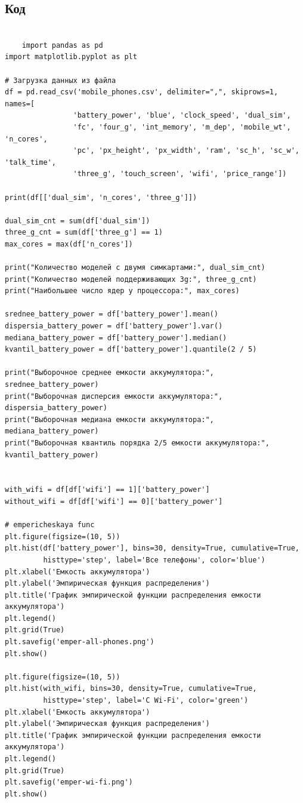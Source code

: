 \documentclass{article}
\begin{document}
\subsection{Код}\label{subsec:3}
\begin{verbatim}

    import pandas as pd
import matplotlib.pyplot as plt

# Загрузка данных из файла
df = pd.read_csv('mobile_phones.csv', delimiter=",", skiprows=1, names=[
                'battery_power', 'blue', 'clock_speed', 'dual_sim',
                'fc', 'four_g', 'int_memory', 'm_dep', 'mobile_wt', 'n_cores',
                'pc', 'px_height', 'px_width', 'ram', 'sc_h', 'sc_w', 'talk_time',
                'three_g', 'touch_screen', 'wifi', 'price_range'])

print(df[['dual_sim', 'n_cores', 'three_g']])

dual_sim_cnt = sum(df['dual_sim'])
three_g_cnt = sum(df['three_g'] == 1)
max_cores = max(df['n_cores'])

print("Количество моделей с двумя симкартами:", dual_sim_cnt)
print("Количество моделей поддерживающих 3g:", three_g_cnt)
print("Наибольшее число ядер у процессора:", max_cores)

srednee_battery_power = df['battery_power'].mean()
dispersia_battery_power = df['battery_power'].var()
mediana_battery_power = df['battery_power'].median()
kvantil_battery_power = df['battery_power'].quantile(2 / 5)

print("Выборочное среднее емкости аккумулятора:", srednee_battery_power)
print("Выборочная дисперсия емкости аккумулятора:", dispersia_battery_power)
print("Выборочная медиана емкости аккумулятора:", mediana_battery_power)
print("Выборочная квантиль порядка 2/5 емкости аккумулятора:", kvantil_battery_power)


with_wifi = df[df['wifi'] == 1]['battery_power']
without_wifi = df[df['wifi'] == 0]['battery_power']

# empericheskaya func
plt.figure(figsize=(10, 5))
plt.hist(df['battery_power'], bins=30, density=True, cumulative=True,
         histtype='step', label='Все телефоны', color='blue')
plt.xlabel('Емкость аккумулятора')
plt.ylabel('Эмпирическая функция распределения')
plt.title('График эмпирической функции распределения емкости аккумулятора')
plt.legend()
plt.grid(True)
plt.savefig('emper-all-phones.png')
plt.show()

plt.figure(figsize=(10, 5))
plt.hist(with_wifi, bins=30, density=True, cumulative=True,
         histtype='step', label='С Wi-Fi', color='green')
plt.xlabel('Емкость аккумулятора')
plt.ylabel('Эмпирическая функция распределения')
plt.title('График эмпирической функции распределения емкости аккумулятора')
plt.legend()
plt.grid(True)
plt.savefig('emper-wi-fi.png')
plt.show()


\end{verbatim}
\end{document}
